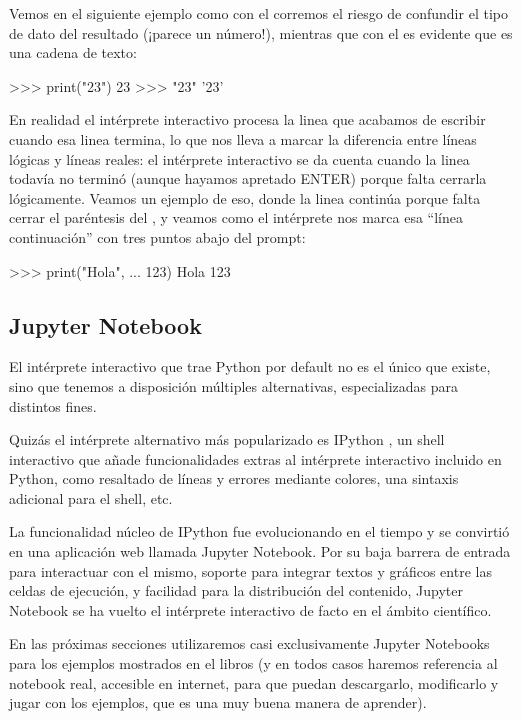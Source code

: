 Vemos en el siguiente ejemplo como con el  corremos el riesgo de confundir el tipo de dato del resultado (¡parece un número!), mientras que con el  es evidente que es una cadena de texto:

\begin{py}
>>> print("23")
23
>>> "23"
'23'
\end{py}

En realidad el intérprete interactivo procesa la linea que acabamos de escribir cuando esa linea termina, lo que nos lleva a marcar la diferencia entre líneas lógicas y líneas reales: el intérprete interactivo se da cuenta cuando la linea todavía no terminó (aunque hayamos apretado ENTER) porque falta cerrarla lógicamente. Veamos un ejemplo de eso, donde la linea continúa porque falta cerrar el paréntesis del , y veamos como el intérprete nos marca esa ``línea continuación'' con tres puntos abajo del prompt:

\begin{py}
>>> print("Hola",
... 123)
Hola 123
\end{py}


\subsection{Jupyter Notebook}

El intérprete interactivo que trae Python por default no es el único que existe, sino que tenemos a disposición múltiples alternativas, especializadas para distintos fines.

Quizás el intérprete alternativo más popularizado es IPython \cite{ipython}, un shell interactivo que añade funcionalidades extras al intérprete interactivo incluido en Python, como resaltado de líneas y errores mediante colores, una sintaxis adicional para el shell, etc.

La funcionalidad núcleo de IPython fue evolucionando en el tiempo y se convirtió en una aplicación web llamada Jupyter Notebook. Por su baja barrera de entrada para interactuar con el mismo, soporte para integrar textos y gráficos entre las celdas de ejecución, y facilidad para la distribución del contenido, Jupyter Notebook se ha vuelto el intérprete interactivo de facto en el ámbito científico.

En las próximas secciones utilizaremos casi exclusivamente Jupyter Notebooks para los ejemplos mostrados en el libros (y en todos casos haremos referencia al notebook real, accesible en internet, para que puedan descargarlo, modificarlo y jugar con los ejemplos, que es una muy buena manera de aprender).


